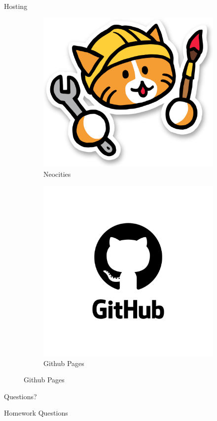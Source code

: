 \documentclass[aspectratio=169,xcolor=dvipsnames]{beamer}
\begin{document}
\begin{frame}{Hosting}
\centering
\begin{figure}[h!]
    \begin{subfigure}{0.4\textwidth}
      \includegraphics[width=1\textwidth]{neocities.png}
      \caption*{\large Neocities}
    \end{subfigure}
    \begin{subfigure}{0.4\textwidth}
      \includegraphics[width=1\textwidth]{Github.jpg}
      \caption*{\large Github Pages}
    \end{subfigure}
\end{figure}

\end{frame}

\begin{frame}
  \center
  \Huge
  Questions?
\end{frame}

\begin{frame}
  \center
  \Huge
  Homework Questions
\end{frame}
\end{document}
